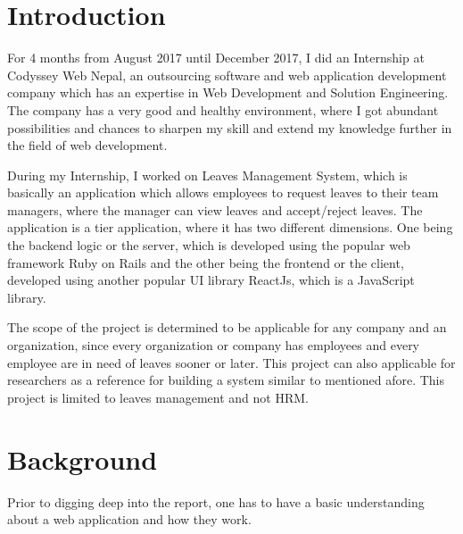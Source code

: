 \section{Introduction}
\noindent
	For 4 months from August 2017 until December 2017, I did an Internship at Codyssey Web
Nepal, an outsourcing software and web application development company which has an
expertise in Web Development and Solution Engineering. The company has a very good and
healthy environment, where I got abundant possibilities and chances to sharpen my skill and
extend my knowledge further in the field of web development.
\newline

\noindent
During my Internship, I worked on Leaves Management System, which is basically an
application which allows employees to request leaves to their team managers, where the
manager can view leaves and accept/reject leaves. The application is a tier application, where
it has two different dimensions. One being the backend logic or the server, which is
developed using the popular web framework Ruby on Rails and the other being the frontend
or the client, developed using another popular UI library ReactJs, which is a JavaScript
library.
\newline

\noindent
The scope of the project is determined to be applicable for any company and an organization,
since every organization or company has employees and every employee are in need of
leaves sooner or later. This project can also applicable for researchers as a reference for
building a system similar to mentioned afore. This project is limited to leaves management
and not HRM.

\section{Background}
Prior to digging deep into the report, one has to have a basic understanding about a web
application and how they work.
\newline
\noindent
